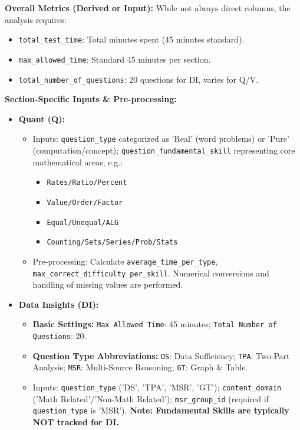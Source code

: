 \documentclass{article}
\begin{document}
\textbf{Overall Metrics (Derived or Input):}
While not always direct columns, the analysis requires:
\begin{itemize}
    \item \texttt{total\_test\_time}: Total minutes spent (45 minutes standard).
    \item \texttt{max\_allowed\_time}: Standard 45 minutes per section.
    \item \texttt{total\_number\_of\_questions}: 20 questions for DI, varies for Q/V.
\end{itemize}

\textbf{Section-Specific Inputs \& Pre-processing:}
\begin{itemize}
    \item \textbf{Quant (Q):}
    \begin{itemize}
        \item Inputs: \texttt{question\_type} categorized as 'Real' (word problems) or 'Pure' (computation/concept); \texttt{question\_fundamental\_skill} representing core mathematical areas, e.g.:
            \begin{itemize}
                \item \texttt{Rates/Ratio/Percent}
                \item \texttt{Value/Order/Factor}
                \item \texttt{Equal/Unequal/ALG}
                \item \texttt{Counting/Sets/Series/Prob/Stats}
            \end{itemize}
        \item Pre-processing: Calculate \texttt{average\_time\_per\_type}, \texttt{max\_correct\_difficulty\_per\_skill}. Numerical conversions and handling of missing values are performed.
    \end{itemize}
    \item \textbf{Data Insights (DI):}
    \begin{itemize}
        \item \textbf{Basic Settings:} \texttt{Max Allowed Time}: 45 minutes; \texttt{Total Number of Questions}: 20.
        \item \textbf{Question Type Abbreviations:} \texttt{DS}: Data Sufficiency; \texttt{TPA}: Two-Part Analysis; \texttt{MSR}: Multi-Source Reasoning; \texttt{GT}: Graph \& Table.
        \item Inputs: \texttt{question\_type} ('DS', 'TPA', 'MSR', 'GT'); \texttt{content\_domain} ('Math Related'/'Non-Math Related'); \texttt{msr\_group\_id} (required if \texttt{question\_type} is 'MSR'). \textbf{Note: Fundamental Skills are typically NOT tracked for DI.}

\end{itemize}
\end{itemize}
\end{document}
